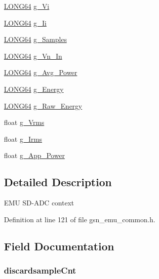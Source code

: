 \begin{DoxyCompactItemize}
\hyperlink{a00660_gae57305825c7d329ad8a3065ae045e875}{LONG64} \hyperlink{a00066_a024d6e0967a6a806a277ed5debe22ed6}{g\_\-Vi}
\item 
\hyperlink{a00660_gae57305825c7d329ad8a3065ae045e875}{LONG64} \hyperlink{a00066_a994b5cc351ab168c7fc6a0bb547770fa}{g\_\-Ii}
\item 
\hyperlink{a00660_gae57305825c7d329ad8a3065ae045e875}{LONG64} \hyperlink{a00066_a763b2f9d5fadb50ff1bc8874f7724079}{g\_\-Samples}
\item 
\hyperlink{a00660_gae57305825c7d329ad8a3065ae045e875}{LONG64} \hyperlink{a00066_a16952e665654a8fad162e83becd272df}{g\_\-Vn\_\-In}
\item 
\hyperlink{a00660_gae57305825c7d329ad8a3065ae045e875}{LONG64} \hyperlink{a00066_a22ed65702277f47ccfb2442dfbb8addf}{g\_\-Avg\_\-Power}
\item 
\hyperlink{a00660_gae57305825c7d329ad8a3065ae045e875}{LONG64} \hyperlink{a00066_a6997f24ad04f1b390042fc1bfc45fdad}{g\_\-Energy}
\item 
\hyperlink{a00660_gae57305825c7d329ad8a3065ae045e875}{LONG64} \hyperlink{a00066_a0798625f2c1b6aecf2fb63cf03949f2d}{g\_\-Raw\_\-Energy}
\item 
float \hyperlink{a00066_ac96544d160851f9ac8132795c1f959e0}{g\_\-Vrms}
\item 
float \hyperlink{a00066_a72422c55ed61af626d537b7c409f2a81}{g\_\-Irms}
\item 
float \hyperlink{a00066_af54c058492b0fb464d5b5724360796b5}{g\_\-App\_\-Power}
\end{DoxyCompactItemize}


\subsection{Detailed Description}
EMU SD-\/ADC context 

Definition at line 121 of file gsn\_\-emu\_\-common.h.



\subsection{Field Documentation}
\hypertarget{a00066_a25e998c8317ee06f6d776a9a0d3c1597}{
\subsubsection[{discardsampleCnt}]{ {\bf discardsampleCnt}}}
\label{a00066_a25e998c8317ee06f6d776a9a0d3c1597}


